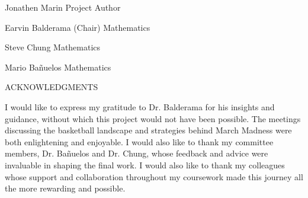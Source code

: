 \documentclass[12pt,leqno]{article}\usepackage[pdftex]{graphicx}\usepackage[dvipsnames]{xcolor}
\theoremstyle{remark}
\begin{document}
\vskip 0.5in

\begin{center}
Jonathen Marin  %
\vskip -0.1in
\makebox[\textwidth]{\hspace{4pc}\hrulefill\hspace{4pc}}
Project Author
\end{center}

\vskip 0.5in

\begin{center}
 \makebox[\textwidth]{\hspace{2pc}\hrulefill\hspace{2pc}}
 \end{center}
 \vskip -0.2in
 \hspace{2pc}%
Earvin Balderama (Chair) \hfill Mathematics  \hspace{2pc}


\vskip 0.3in
\begin{center}
 \makebox[\textwidth]{\hspace{2pc}\hrulefill\hspace{2pc}}
 \end{center}
 \vskip -0.2in
 \hspace{2pc}%
Steve Chung \hfill Mathematics  \hspace{2pc}

\vskip 0.3in
\begin{center}
\makebox[\textwidth]{\hspace{2pc}\hrulefill\hspace{2pc}}
\end{center}
\vskip -0.2in
\hspace{2pc}%
Mario Bañuelos \hfill Mathematics \hspace{2pc}   %

\thispagestyle{empty}
\newpage

\begin{center}
ACKNOWLEDGMENTS
\end{center}
\doublespacing
I would like to express my gratitude to Dr. Balderama for his insights and guidance, without which this project would not have been possible. The meetings discussing the basketball landscape and strategies behind March Madness were both enlightening and enjoyable. I would also like to thank my committee members, Dr. Bañuelos and Dr. Chung, whose feedback and advice were invaluable in shaping the final work. I would also like to thank my colleagues whose support and collaboration throughout my coursework made this journey all the more rewarding and possible.
\end{document}
